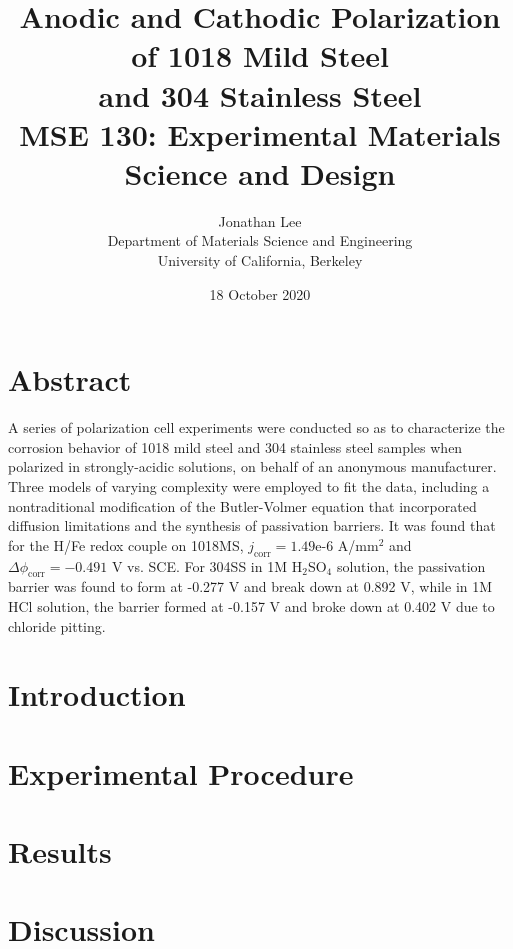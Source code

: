 \documentclass[12pt, titlepage]{article}
\title{\Large Anodic and Cathodic Polarization of 1018 Mild Steel \\
		and 304 Stainless Steel \\
		\bigskip
	\normalsize MSE 130: Experimental Materials Science and Design}
\author{\normalsize Jonathan Lee \\
	\normalsize Department of Materials Science and Engineering \\
	\normalsize University of California, Berkeley}
\date{\normalsize 18 October 2020}
\begin{document}
\maketitle

\setcounter{page}{2}

\tableofcontents

\doublespacing

\newpage

\section{Abstract}

A series of polarization cell experiments were conducted so as to characterize the corrosion behavior of 1018 mild steel and 304 stainless steel samples when polarized in strongly-acidic solutions, on behalf of an anonymous manufacturer.  Three models of varying complexity were employed to fit the data, including a nontraditional modification of the Butler-Volmer equation that incorporated diffusion limitations and the synthesis of passivation barriers.  It was found that for the H/Fe redox couple on 1018MS, $j_{\text{corr}} = 1.49$e-6 A/mm$^2$ and $\Delta \phi_{\text{corr}} = -0.491$ V vs. SCE.  For 304SS in 1M H$_2$SO$_4$ solution, the passivation barrier was found to form at -0.277 V and break down at 0.892 V, while in 1M HCl solution, the barrier formed at -0.157 V and broke down at 0.402 V due to chloride pitting.

\section{Introduction}



\section{Experimental Procedure}



\section{Results}



\section{Discussion}
\end{document}
